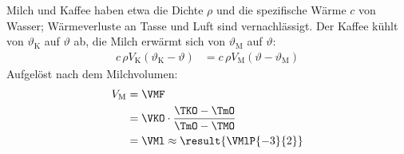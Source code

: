 Milch und Kaffee haben etwa die Dichte $\rho$ und die spezifische Wärme $c$ von Wasser; Wärmeverluste an Tasse und Luft sind vernachlässigt. Der Kaffee kühlt von $\vartheta_\text{K}$ auf $\vartheta$ ab, die Milch erwärmt sich von $\vartheta_\text{M}$ auf $\vartheta$:
\begin{align}
 c\,\rho V_\text{K}\left(\vartheta_\text{K}-\vartheta\right) &= c\,\rho V_\text{M}\left(\vartheta-\vartheta_\text{M}\right)
\end{align}
Aufgelöst nach dem Milchvolumen:
\begin{align}
 V_\text{M} &= \VMF \\
   &= \VKO\cdot\frac{\TKO-\TmO}{\TmO-\TMO} \\
   &= \VMl \approx \result{\VMlP{-3}{2}}
\end{align}
